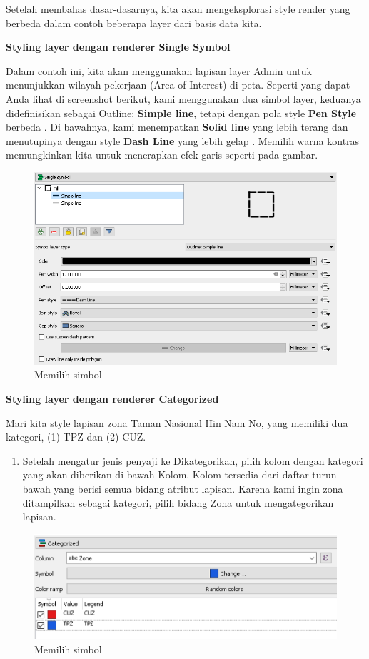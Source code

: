 \documentclass[]{book}
\providecommand{\tightlist}{%
  \setlength{\itemsep}{0pt}\setlength{\parskip}{0pt}}
\begin{document}
Setelah membahas dasar-dasarnya, kita akan mengeksplorasi style render yang berbeda dalam contoh beberapa layer dari basis data kita.

\textbf{Styling layer dengan renderer Single Symbol}

Dalam contoh ini, kita akan menggunakan lapisan layer Admin untuk menunjukkan wilayah pekerjaan (Area of Interest) di peta. Seperti yang dapat Anda lihat di screenshot berikut, kami menggunakan dua simbol layer, keduanya didefinisikan sebagai Outline: \textbf{Simple line}, tetapi dengan pola style \textbf{Pen Style} berbeda . Di bawahnya, kami menempatkan \textbf{Solid line} yang lebih terang dan menutupinya dengan style \textbf{Dash Line} yang lebih gelap . Memilih warna kontras memungkinkan kita untuk menerapkan efek garis seperti pada gambar.

\begin{figure}

{\centering \includegraphics[width=0.6\linewidth]{images/09/fig94} 

}

\caption{Memilih simbol}\label{fig:fig94}
\end{figure}

\textbf{Styling layer dengan renderer Categorized}

Mari kita style lapisan zona Taman Nasional Hin Nam No, yang memiliki dua kategori, (1) TPZ dan (2) CUZ.

\begin{enumerate}
\def\labelenumi{\arabic{enumi}.}
\tightlist
\item
  Setelah mengatur jenis penyaji ke Dikategorikan, pilih kolom dengan kategori yang akan diberikan di bawah Kolom. Kolom tersedia dari daftar turun bawah yang berisi semua bidang atribut lapisan. Karena kami ingin zona ditampilkan sebagai kategori, pilih bidang Zona untuk mengategorikan lapisan.
\end{enumerate}

\begin{figure}

{\centering \includegraphics[width=0.3\linewidth]{images/09/fig95} 

}

\caption{Memilih simbol}\label{fig:fig95}
\end{figure}
\end{document}
